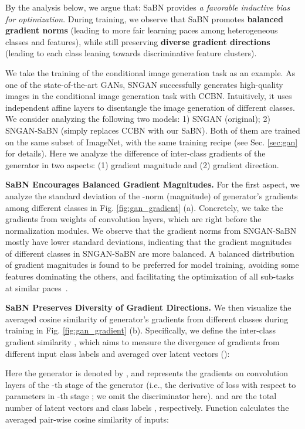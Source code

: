 \documentclass{article}
\begin{document}
By the analysis below, we argue that: SaBN provides \textit{a favorable inductive bias for optimization}. During training, we observe that SaBN promotes \textbf{balanced gradient norms} (leading to more fair learning paces among heterogeneous classes and features), while still preserving \textbf{diverse gradient directions} (leading to each class leaning towards discriminative feature clusters).





We take the training of the conditional image generation task as an example. As one of the state-of-the-art GANs, SNGAN \citep{miyato2018spectral} successfully generates high-quality images in the conditional image generation task with CCBN. Intuitively, it uses independent affine layers to disentangle the image generation of different classes.
We consider analyzing the following two models: 1) SNGAN (original); 2) SNGAN-SaBN (simply replaces CCBN with our SaBN). Both of them are trained on the same subset of ImageNet, with the same training recipe (see Sec. \ref{sec:gan} for details). Here we analyze the difference of inter-class gradients of the generator in two aspects: (1) gradient magnitude and (2) gradient direction.

\textbf{SaBN Encourages Balanced Gradient Magnitudes.}
For the first aspect, we analyze the standard deviation of the -norm (magnitude) of generator's gradients among different classes in Fig. \ref{fig:gan_gradient} (a). Concretely, we take the gradients from weights of convolution layers, which are right before the normalization modules. We observe that the gradient norms from SNGAN-SaBN mostly have lower standard deviations, indicating that the gradient magnitudes of different classes in SNGAN-SaBN are more balanced. A balanced distribution of gradient magnitudes is found to be preferred for model training, avoiding some features dominating the others, and facilitating the optimization of all sub-tasks at similar paces~\cite{yu2020gradient}.



\textbf{SaBN Preserves Diversity of Gradient Directions.}
We then visualize the averaged cosine similarity of generator's gradients from different classes during training in Fig. \ref{fig:gan_gradient} (b). Specifically, we define the inter-class gradient similarity , which aims to measure the divergence of gradients from different input class labels  and averaged over latent vectors ():

Here the generator is denoted by , and  represents the gradients on convolution layers of the -th stage of the generator (i.e., the derivative of loss  with respect to parameters in -th stage ; we omit the discriminator here).  and  are the total number of latent vectors  and class labels , respectively. Function  calculates the averaged pair-wise cosine similarity of inputs:
\end{document}
